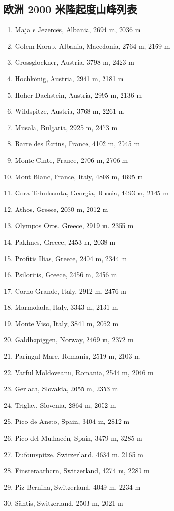 \documentclass[10pt,twocolumn,letterpaper]{article}
\begin{document}
\subsection{欧洲 2000 米隆起度山峰列表}

\begin{flushleft}
\begin{enumerate}
    \item Maja e Jezercës, Albania, 2694 m, 2036 m
    \item Golem Korab, Albania, Macedonia, 2764 m, 2169 m
    \item Grossglockner, Austria, 3798 m, 2423 m
    \item Hochkönig, Austria, 2941 m, 2181 m
    \item Hoher Dachstein, Austria, 2995 m, 2136 m
    \item Wildspitze, Austria, 3768 m, 2261 m
    \item Musala, Bulgaria, 2925 m, 2473 m
    \item Barre des Écrins, France, 4102 m, 2045 m
    \item Monte Cinto, France, 2706 m, 2706 m
    \item Mont Blanc, France, Italy, 4808 m, 4695 m
    \item Gora Tebulosmta, Georgia, Russia, 4493 m, 2145 m
    \item Athos, Greece, 2030 m, 2012 m
    \item Olympos Oros, Greece, 2919 m, 2355 m
    \item Pakhnes, Greece, 2453 m, 2038 m
    \item Profitis Ilias, Greece, 2404 m, 2344 m
    \item Psiloritis, Greece, 2456 m, 2456 m
    \item Corno Grande, Italy, 2912 m, 2476 m
    \item Marmolada, Italy, 3343 m, 2131 m
    \item Monte Viso, Italy, 3841 m, 2062 m
    \item Galdhøpiggen, Norway, 2469 m, 2372 m
    \item Parîngul Mare, Romania, 2519 m, 2103 m
    \item Varful Moldoveanu, Romania, 2544 m, 2046 m
    \item Gerlach, Slovakia, 2655 m, 2353 m
    \item Triglav, Slovenia, 2864 m, 2052 m
    \item Pico de Aneto, Spain, 3404 m, 2812 m
    \item Pico del Mulhacén, Spain, 3479 m, 3285 m
    \item Dufourspitze, Switzerland, 4634 m, 2165 m
    \item Finsteraarhorn, Switzerland, 4274 m, 2280 m
    \item Piz Bernina, Switzerland, 4049 m, 2234 m
    \item Säntis, Switzerland, 2503 m, 2021 m
\end{enumerate}
\end{flushleft}
\end{document}

